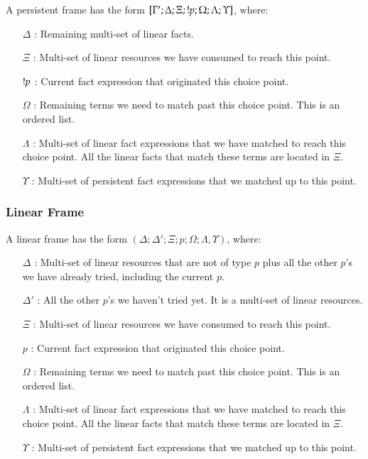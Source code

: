 A persistent frame has the form $[\Gamma'; \Delta; \Xi; {!} p; \Omega; \Lambda; \Upsilon]$, where:

\begin{enumerate}
   \item[$\Delta$]: Remaining multi-set of linear facts.
   \item[$\Xi$]: Multi-set of linear resources we have consumed to reach this point.
   \item[${!} p$]: Current fact expression that originated this choice point.
   \item[$\Omega$]: Remaining terms we need to match past this choice point. This is an ordered list.
   \item[$\Lambda$]: Multi-set of linear fact expressions that we have matched to reach this choice point. All the linear facts that match these terms are located in $\Xi$.
   \item[$\Upsilon$]: Multi-set of persistent fact expressions that we matched up to this point.
\end{enumerate}

\subsubsection{Linear Frame}

A linear frame has the form $(\Delta; \Delta'; \Xi; p; \Omega; \Lambda, \Upsilon)$, where:

\begin{enumerate}
   \item[$\Delta$]: Multi-set of linear resources that are not of type $p$ plus all the other $p$'s we have already tried, including the current $p$.
   \item[$\Delta'$]: All the other $p$'s we haven't tried yet. It is a multi-set of linear resources.
   \item[$\Xi$]: Multi-set of linear resources we have consumed to reach this point.
   \item[$p$]: Current fact expression that originated this choice point.
   \item[$\Omega$]: Remaining terms we need to match past this choice point. This is an ordered list.
   \item[$\Lambda$]: Multi-set of linear fact expressions that we have matched to reach this choice point. All the linear facts that match these terms are located in $\Xi$.
   \item[$\Upsilon$]: Multi-set of persistent fact expressions that we matched up to this point.
\end{enumerate}

